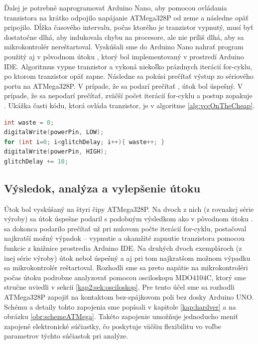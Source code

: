 Ďalej je potrebné naprogramovať Arduino Nano, aby pomocou ovládania tranzistora na krátko odpojilo napájanie ATMega328P od zeme a následne opäť pripojilo. Dĺžka časového intervalu, počas ktorého je tranzistor vypnutý, musí byť dostatočne dlhá, aby indukovala chybu na procesore, ale nie príliš dlhá, aby sa mikrokontrolér nereštartoval. Vyskúšali sme do Arduino Nano nahrať program použitý aj v pôvodnom útoku \cite{vccOnTheCheap}, ktorý bol implementovaný v prostredí Arduino IDE. Algoritmus vypne tranzistor a vykoná niekoľko prázdnych iterácií for-cyklu, po ktorom tranzistor opäť zapne. Následne sa pokúsi prečítať výstup zo sériového portu na ATMega328P. V prípade, že sa podarí prečítať , útok bol úspešný. V prípade, že sa  nepodarí prečítať, zväčší počet iterácií for-cyklu a postup zopakuje \cite{vccOnTheCheap}. Ukážka časti kódu, ktorá ovláda tranzistor, je v algoritme \ref{alg:vccOnTheCheap}.

\begin{lstlisting}[float,language=C,caption={Ovládanie tranzistora, ktorý spína napájanie na ATMega328P. Prevzaté zo zdrojového kódu pôvodného útoku \cite{vccOnTheCheap}. Cieľom premennej \uv{waste} je zabrániť, aby optimalizácia kompilátora odstránila for-cyklus.},label=alg:vccOnTheCheap]
int waste = 0;
digitalWrite(powerPin, LOW);
for (int i=0; i<glitchDelay; i++){ waste++; }                    
digitalWrite(powerPin, HIGH);
glitchDelay += 10;
\end{lstlisting}

\subsection{Výsledok, analýza a vylepšenie útoku}
Útok bol vyskúšaný na štyri čipy ATMega328P. Na dvoch z nich (z rovnakej série výroby) sa útok úspešne podaril s podobným výsledkom ako v pôvodnom útoku \cite{vccOnTheCheap}.  sa dokonca podarilo prečítať už pri nulovom počte iterácií for-cyklu, postačoval najkratší možný výpadok -- vypnutie a okamžité zapnutie tranzistora pomocou funkcie  z knižnice prostredia Arduino IDE. Na druhých dvoch exemplároch (z inej série výroby) útok nebol úspešný a aj pri tom najkratšom možnom výpadku sa mikrokontrolér reštartoval. Rozhodli sme sa preto napätie na mikrokontroléri počas útoku podrobne analyzovať pomocou osciloskopu MDO4104C, ktorý sme stručne uviedli v sekcii \ref{kap2:sek:osciloskop}. Pre tento účel sme sa rozhodli ATMega328P zapojiť na kontaktom bez-spájkovom poli bez dosky Arduino UNO. Schému a detaily tohto zapojenia sme popísali v kapitole \ref{kap:hardver} a na obrázku \ref{obr:schemeATMega}. Takéto zapojenie umožňuje jednoducho meniť zapojené elektronické súčiastky, čo poskytuje väčšiu flexibilitu vo voľbe parametrov týchto súčiastok pri analýze.

